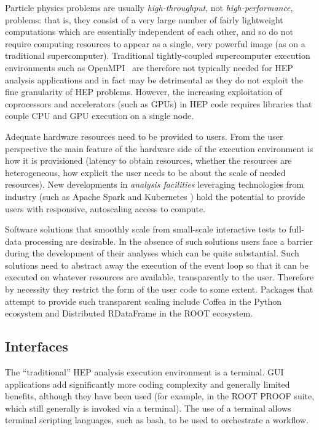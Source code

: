 Particle physics problems are usually \textit{high-throughput}, not \textit{high-performance}, problems: that is, they consist of a very large number of fairly lightweight computations which are essentially independent of each other, and so do not require computing resources to appear as a single, very powerful image (as on a traditional supercomputer). Traditional tightly-coupled supercomputer execution environments such as OpenMPI~\cite{gabriel04:_open_mpi} are therefore not typically needed for HEP analysis applications and in fact may be detrimental as they do not exploit the fine granularity of HEP problems. However, the increasing exploitation of coprocessors and accelerators (such as GPUs) in HEP code requires libraries that couple CPU and GPU execution on a single node.

Adequate hardware resources need to be provided to users. From the user perspective the main feature of the hardware side of the execution environment is how it is provisioned (latency to obtain resources, whether the resources are heterogeneous, how explicit the user needs to be about the scale of needed resources). New developments in \textit{analysis facilities} \cite{Benjamin:2022dpo,Adamec:2021vkl} leveraging technologies from industry (such as Apache Spark \cite{Spark} and Kubernetes \cite{Kubernetes}) hold the potential to provide users with responsive, autoscaling access to compute.

Software solutions that smoothly scale from small-scale interactive tests to full-data processing are desirable. In the absence of such solutions users face a barrier during the development of their analyses which can be quite substantial. Such solutions need to abstract away the execution of the event loop so that it can be executed on whatever resources are available, transparently to the user. Therefore by necessity they restrict the form of the user code to some extent. Packages that attempt to provide such transparent scaling include Coffea \cite{Smith:2020pxs} in the Python ecosystem and Distributed RDataFrame \cite{Padulano:2020wmf} in the ROOT ecosystem.



\subsection{Interfaces}

The ``traditional'' HEP analysis execution environment is a terminal. GUI applications add significantly more coding complexity and generally limited benefits, although they have been used (for example, in the ROOT PROOF suite, which still generally is invoked via a terminal). The use of a terminal allows terminal scripting languages, such as bash, to be used to orchestrate a workflow.

